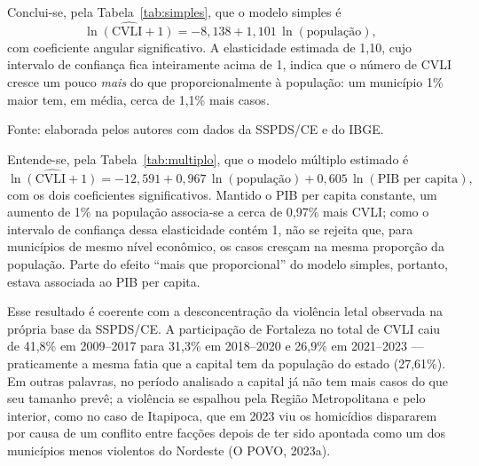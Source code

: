 \documentclass[12pt,a4paper]{article}
\newcommand{\fonte}[1]{
	\vspace{-2mm}
	\begin{center}\footnotesize Fonte: #1\end{center}
}
\newcommand{\fontedados}{elaborada pelos autores com dados da SSPDS/CE e do IBGE.}
\begin{document}
	Conclui-se, pela Tabela~\ref{tab:simples}, que o modelo simples é
	\[
	\widehat{\ln(\text{CVLI}+1)} = -8{,}138 + 1{,}101\,\ln(\text{população}),
	\]
	com coeficiente angular significativo. A elasticidade estimada de 1,10, cujo intervalo de confiança fica inteiramente acima de 1, indica que o número de CVLI cresce um pouco \emph{mais} do que proporcionalmente à população: um município 1\% maior tem, em média, cerca de 1,1\% mais casos.
	
	\begin{table}[H]
		\centering
		\caption{Modelo de regressão linear múltipla: $\ln(\text{CVLI}+1)$ em função de $\ln(\text{população})$ e $\ln(\text{PIB per capita})$}
		\label{tab:multiplo}
		\small
	\end{table}
	\fonte{\fontedados}
	
	Entende-se, pela Tabela~\ref{tab:multiplo}, que o modelo múltiplo estimado é
	\[
	\widehat{\ln(\text{CVLI}+1)} = -12{,}591 + 0{,}967\,\ln(\text{população}) + 0{,}605\,\ln(\text{PIB per capita}),
	\]
	com os dois coeficientes significativos. Mantido o PIB per capita constante, um aumento de 1\% na população associa-se a cerca de 0,97\% mais CVLI; como o intervalo de confiança dessa elasticidade contém 1, não se rejeita que, para municípios de mesmo nível econômico, os casos cresçam na mesma proporção da população. Parte do efeito ``mais que proporcional'' do modelo simples, portanto, estava associada ao PIB per capita.
	
	Esse resultado é coerente com a desconcentração da violência letal observada na própria base da SSPDS/CE. A participação de Fortaleza no total de CVLI caiu de 41,8\% em 2009--2017 para 31,3\% em 2018--2020 e 26,9\% em 2021--2023 --- praticamente a mesma fatia que a capital tem da população do estado (27,61\%). Em outras palavras, no período analisado a capital já não tem mais casos do que seu tamanho prevê; a violência se espalhou pela Região Metropolitana e pelo interior, como no caso de Itapipoca, que em 2023 viu os homicídios dispararem por causa de um conflito entre facções depois de ter sido apontada como um dos municípios menos violentos do Nordeste (O POVO, 2023a).
	
\end{document}
